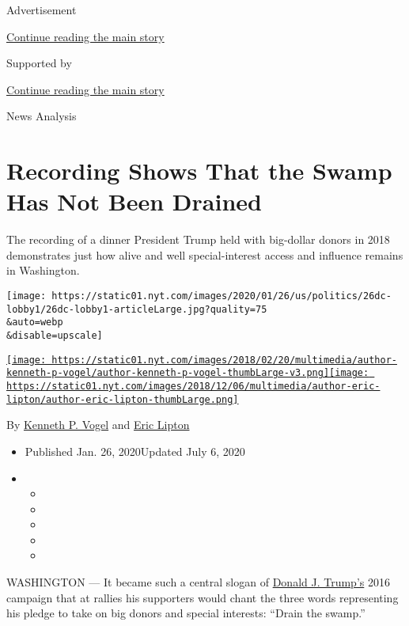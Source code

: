 Advertisement

\protect\hyperlink{after-top}{Continue reading the main story}

Supported by

\protect\hyperlink{after-sponsor}{Continue reading the main story}

News Analysis

\hypertarget{recording-shows-that-the-swamp-has-not-been-drained}{%
\section{Recording Shows That the Swamp Has Not Been
Drained}\label{recording-shows-that-the-swamp-has-not-been-drained}}

The recording of a dinner President Trump held with big-dollar donors in
2018 demonstrates just how alive and well special-interest access and
influence remains in Washington.

\texttt{[image: https://static01.nyt.com/images/2020/01/26/us/politics/26dc-lobby1/26dc-lobby1-articleLarge.jpg?quality=75\\\&auto=webp\\\&disable=upscale]}

\href{https://www.nytimes.com/by/kenneth-p-vogel}{\texttt{[image: https://static01.nyt.com/images/2018/02/20/multimedia/author-kenneth-p-vogel/author-kenneth-p-vogel-thumbLarge-v3.png]}}\href{https://www.nytimes.com/by/eric-lipton}{\texttt{[image: https://static01.nyt.com/images/2018/12/06/multimedia/author-eric-lipton/author-eric-lipton-thumbLarge.png]}}

By \href{https://www.nytimes.com/by/kenneth-p-vogel}{Kenneth P. Vogel}
and \href{https://www.nytimes.com/by/eric-lipton}{Eric Lipton}

\begin{itemize}
\item
  Published Jan. 26, 2020Updated July 6, 2020
\item
  \begin{itemize}
  \item
  \item
  \item
  \item
  \item
  \end{itemize}
\end{itemize}

WASHINGTON --- It became such a central slogan of
\href{https://www.nytimes.com/2020/07/06/us/politics/trump-lobbyists-swamp-campaign.html}{Donald
J. Trump's} 2016 campaign that at rallies his supporters would chant the
three words representing his pledge to take on big donors and special
interests: ``Drain the swamp.''


